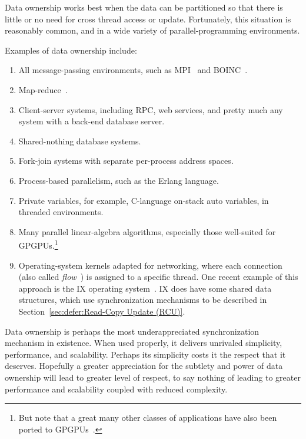 Data ownership works best when the data can be partitioned so that there
is little or no need for cross thread access or update.
Fortunately, this situation is reasonably common, and in a wide variety
of parallel-programming environments.

Examples of data ownership include:

\begin{enumerate}
\item	All message-passing environments, such as MPI~\cite{MPIForum2008}
	and BOINC~\cite{BOINC2008}.
\item	Map-reduce~\cite{MapReduce2008MIT}.
\item	Client-server systems, including RPC, web services, and
	pretty much any system with a back-end database server.
\item	Shared-nothing database systems.
\item	Fork-join systems with separate per-process address spaces.
\item	Process-based parallelism, such as the Erlang language.
\item	Private variables, for example, C-language on-stack auto variables,
	in threaded environments.
\item	Many parallel linear-algebra algorithms, especially those
	well-suited for GPGPUs.\footnote{
		But note that a great many other classes of applications
		have also been ported to
		GPGPUs~\cite{NormMatloff2017ParProcBook,AMD2020ROCm,NVidia2017GPGPU,NVidia2017GPGPU-university}.}
\item	Operating-system kernels adapted for networking, where each connection
	(also called \emph{flow}~\cite{Shenker89,ZhangPhD,McKenney90})
	is assigned to a specific thread.
	One recent example of this approach is the IX operating
	system~\cite{Belay:2016:IOS:3014162.2997641}.
	IX does have some shared data structures, which use synchronization
	mechanisms to be described in
	Section~\ref{sec:defer:Read-Copy Update (RCU)}.
\end{enumerate}

Data ownership is perhaps the most underappreciated synchronization
mechanism in existence.
When used properly, it delivers unrivaled simplicity, performance,
and scalability.
Perhaps its simplicity costs it the respect that it deserves.
Hopefully a greater appreciation for the subtlety and power of data ownership
will lead to greater level of respect, to say nothing of leading to
greater performance and scalability coupled with reduced complexity.


